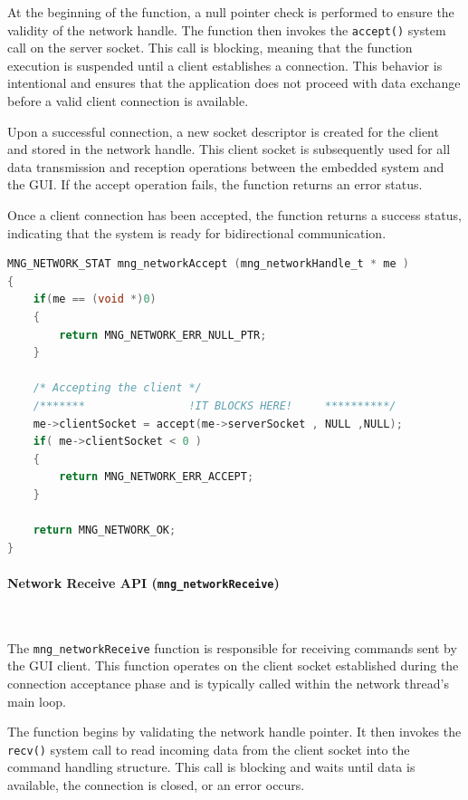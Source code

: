 \documentclass{article}
\begin{document}
At the beginning of the function, a null pointer check is performed to ensure the 
validity of the network handle. The function then invokes the \texttt{accept()} system 
call on the server socket. This call is blocking, meaning that the function execution 
is suspended until a client establishes a connection. This behavior is intentional 
and ensures that the application does not proceed with data exchange before a valid 
client connection is available.

Upon a successful connection, a new socket descriptor is created for the client and 
stored in the network handle. This client socket is subsequently used for all data 
transmission and reception operations between the embedded system and the GUI. If the 
accept operation fails, the function returns an error status.

Once a client connection has been accepted, the function returns a success status, 
indicating that the system is ready for bidirectional communication.

\begin{lstlisting}[language=C,
caption={Network Accept API},
label={lst:mng_networkAccept_api}]
MNG_NETWORK_STAT mng_networkAccept (mng_networkHandle_t * me )
{
    if(me == (void *)0)
    {
        return MNG_NETWORK_ERR_NULL_PTR;
    }

    /* Accepting the client */
    /*******                !IT BLOCKS HERE!     **********/
    me->clientSocket = accept(me->serverSocket , NULL ,NULL);
    if( me->clientSocket < 0 )
    {
        return MNG_NETWORK_ERR_ACCEPT;
    }
    
    return MNG_NETWORK_OK;
}
\end{lstlisting}


\paragraph{Network Receive API (\texttt{mng\_networkReceive})}\

The \texttt{mng\_networkReceive} function is responsible for receiving commands sent by 
the GUI client. This function operates on the client socket established during the 
connection acceptance phase and is typically called within the network thread’s main 
loop.

The function begins by validating the network handle pointer. It then invokes the 
\texttt{recv()} system call to read incoming data from the client socket into the 
command handling structure. This call is blocking and waits until data is available, 
the connection is closed, or an error occurs.
\end{document}
